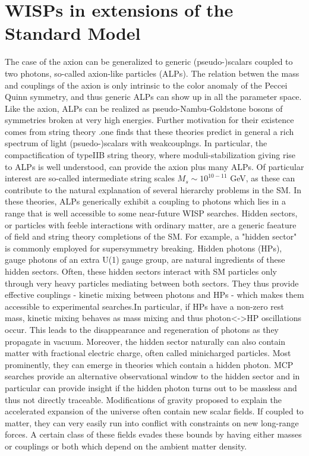 \documentclass[11pt]{book}
\begin{document}
\section{WISPs in extensions of the Standard Model}
The case of the axion can be generalized to generic (pseudo-)scalars coupled to two photons, so-called axion-like particles (ALPs). The relation betwen the mass and couplings of the axion is only intrinsic to the color anomaly of the Peccei Quinn symmetry, and thus generic ALPs can show up in all the parameter space.
Like the axion, ALPs can be realized as pseudo-Nambu-Goldstone bosons of symmetries broken at very high energies. Further motivation for their existence comes from string theory .one finds that these theories predict in general a rich spectrum of light (psuedo-)scalars with weakcouplngs. In particular, the compactification of typeIIB string theory, where moduli-stabilization giving rise to ALPs is well understood, can provide the axion plus many ALPs. Of particular interest are so-called intermediate string scales $M_s \sim 10^{10-11}$ GeV, as these can contribute to the natural explanation of several hierarchy problems in the SM. In these theories, ALPs generically exhibit a coupling to photons which lies in a range that is well accessible to some near-future WISP searches.
Hidden sectors, or particles with feeble interactions with ordinary matter, are a generic faeature of field and string theory completions of the SM. For example, a "hidden sector" is commonly employed for supersymmetry breaking. Hidden photons (HPs), gauge photons of an extra U(1) gauge group, are natural ingredients of these hidden sectors. Often, these hidden sectors interact with SM particles only through very heavy particles mediating between both sectors. They thus provide effective couplings - kinetic mixing between photons and HPs - which makes them accessible to experimental searches.In particular, if HPs have a non-zero rest mass, kinetic mixing behaves as mass mixing and thus photon<->HP oscillations occur. This leads to the disappearance and regeneration of photons as they propagate in vacuum. Moreover, the hidden sector naturally can also contain matter with fractional electric charge, often called minicharged particles. Most prominently, they can emerge in theories which contain a hidden photon. MCP searches provide an alternative observational window to the hidden sector and in particular can provide insight if the hidden photon turns out to be massless and thus not directly traceable.
Modifications of gravity proposed to explain the accelerated expansion of the universe often contain new scalar fields. If coupled to matter, they can very easily run into conflict with constraints on new long-range forces. A certain class of these fields evades these bounds by having either masses or couplings or both which depend on the ambient matter density.
\end{document}
